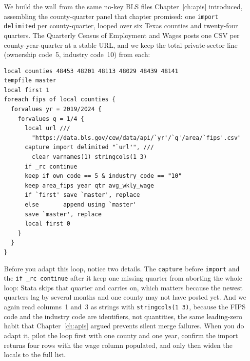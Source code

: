 \documentclass[
    a4paper,
    fontsize=10pt,
    twoside=true,
    numbers=noenddot,
]{kaobook}
\begin{document}
We build the wall from the same no-key BLS files Chapter~\ref{ch:apis} introduced, assembling the county-quarter panel that chapter promised: one \texttt{import delimited} per county-quarter, looped over six Texas counties and twenty-four quarters. The Quarterly Census of Employment and Wages posts one CSV per county-year-quarter at a stable URL, and we keep the total private-sector line (ownership code~5, industry code~10) from each:
\par
{\footnotesize
\begin{verbatim}
local counties 48453 48201 48113 48029 48439 48141
tempfile master
local first 1
foreach fips of local counties {
  forvalues yr = 2019/2024 {
    forvalues q = 1/4 {
      local url ///
        "https://data.bls.gov/cew/data/api/`yr'/`q'/area/`fips'.csv"
      capture import delimited "`url'", ///
        clear varnames(1) stringcols(1 3)
      if _rc continue
      keep if own_code == 5 & industry_code == "10"
      keep area_fips year qtr avg_wkly_wage
      if `first' save `master', replace
      else       append using `master'
      save `master', replace
      local first 0
    }
  }
}
\end{verbatim}
}
Before you adapt this loop, notice two details. The \texttt{capture} before \texttt{import} and the \texttt{if \_rc continue} after it keep one missing quarter from aborting the whole loop: Stata skips that quarter and carries on, which matters because the newest quarters lag by several months and one county may not have posted yet. And we again read columns~1 and~3 as strings with \texttt{stringcols(1 3)}, because the FIPS code and the industry code are identifiers, not quantities, the same leading-zero habit that Chapter~\ref{ch:apis} argued prevents silent merge failures. When you do adapt it, pilot the loop first with one county and one year, confirm the import returns four rows with the wage column populated, and only then widen the locals to the full list.
\end{document}
